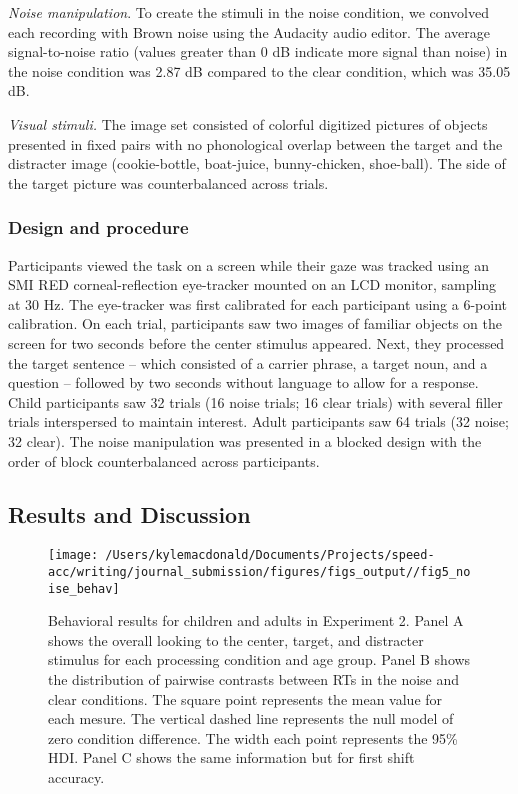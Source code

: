 \documentclass[,man,floatsintext]{apa6}
\begin{document}
\emph{Noise manipulation}. To create the stimuli in the noise condition,
we convolved each recording with Brown noise using the Audacity audio
editor. The average signal-to-noise ratio (values greater than 0 dB
indicate more signal than noise) in the noise condition was 2.87 dB
compared to the clear condition, which was 35.05 dB.

\emph{Visual stimuli.} The image set consisted of colorful digitized
pictures of objects presented in fixed pairs with no phonological
overlap between the target and the distracter image (cookie-bottle,
boat-juice, bunny-chicken, shoe-ball). The side of the target picture
was counterbalanced across trials.

\subsubsection{Design and procedure}\label{design-and-procedure-1}

Participants viewed the task on a screen while their gaze was tracked
using an SMI RED corneal-reflection eye-tracker mounted on an LCD
monitor, sampling at 30 Hz. The eye-tracker was first calibrated for
each participant using a 6-point calibration. On each trial,
participants saw two images of familiar objects on the screen for two
seconds before the center stimulus appeared. Next, they processed the
target sentence -- which consisted of a carrier phrase, a target noun,
and a question -- followed by two seconds without language to allow for
a response. Child participants saw 32 trials (16 noise trials; 16 clear
trials) with several filler trials interspersed to maintain interest.
Adult participants saw 64 trials (32 noise; 32 clear). The noise
manipulation was presented in a blocked design with the order of block
counterbalanced across participants.

\subsection{Results and Discussion}\label{results-and-discussion}

\begin{figure}[!t]

{\centering \texttt{[image: /Users/kylemacdonald/Documents/Projects/speed-acc/writing/journal\_submission/figures/figs\_output//fig5\_noise\_behav]} 

}

\caption{Behavioral results for children and adults in Experiment 2. Panel A shows the overall looking to the center, target, and distracter stimulus for each processing condition and age group. Panel B shows the distribution of pairwise contrasts between RTs in the noise and clear conditions. The square point represents the mean value for each mesure. The vertical dashed line represents the null model of zero condition difference. The width each point represents the 95\% HDI. Panel C shows the same information but for first shift accuracy.}\label{fig:noise-acc-rt-plot}
\end{figure}
\end{document}

